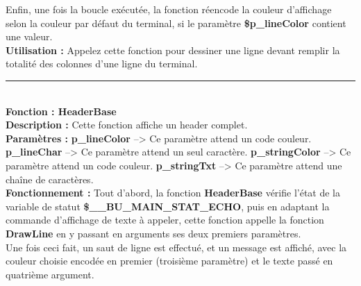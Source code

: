 \documentclass[a4paper,10pt]{article}
\begin{document}
Enfin, une fois la boucle exécutée, la fonction réencode la couleur d'affichage selon la couleur par\linebreak
défaut du terminal, si le paramètre \textbf{\color{orange}\$p\_lineColor\color{white}} contient une valeur.\\[1\baselineskip]

\textbf{Utilisation :}\linebreak
Appelez cette fonction pour dessiner une ligne devant remplir la totalité des colonnes d'une ligne du terminal.\\[2\baselineskip]


\par\noindent\rule{\textwidth}{0.4pt}\\[1\baselineskip]

\textbf{Fonction : \color{mauve}HeaderBase\color{white}}\\[1\baselineskip]
\textbf{Description :}\linebreak
Cette fonction affiche un header complet.\\[1\baselineskip]

\textbf{Paramètres :}\linebreak
\textbf{\color{orange}p\_lineColor\color{white}} --> Ce paramètre attend un code couleur.\linebreak
\textbf{\color{orange}p\_lineChar\color{white}} --> Ce paramètre attend un seul caractère.\linebreak
\textbf{\color{orange}p\_stringColor\color{white}} --> Ce paramètre attend un code couleur.\linebreak
\textbf{\color{orange}p\_stringTxt\color{white}} --> Ce paramètre attend une chaîne de caractères.\\[1\baselineskip]

\textbf{Fonctionnement :}\linebreak
Tout d'abord, la fonction \textbf{\color{mauve}HeaderBase\color{white}} vérifie l'état de la variable de statut \textbf{\color{orange}\$\_\_BU\_MAIN\_STAT\_ECHO\color{white}}, puis en adaptant la commande d'affichage de texte à appeler, cette fonction appelle la fonction \textbf{\color{mauve}DrawLine\color{white}} en y passant en arguments ses deux premiers paramètres.\\[1\baselineskip]

Une fois ceci fait, un saut de ligne est effectué, et un message est affiché, avec la couleur choisie\linebreak
encodée en premier (troisième paramètre) et le texte passé en quatrième argument.\\[1\baselineskip]
\end{document}
